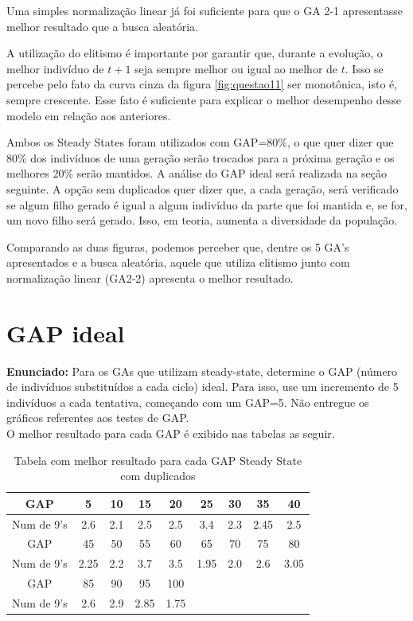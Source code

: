 \documentclass[12pt]{article}
\begin{document}
Uma simples normalização linear já foi suficiente para que o GA 2-1 apresentasse melhor resultado que a busca aleatória.

A utilização do elitismo é importante por garantir que, durante a evolução, o melhor indivíduo de $t+1$ seja sempre melhor ou igual ao melhor de $t$. Isso se percebe pelo fato da curva cinza da figura \ref{fig:questao11} ser monotônica, isto é, sempre crescente. Esse fato é suficiente para explicar o melhor desempenho desse modelo em relação aos anteriores.

Ambos os Steady States foram utilizados com GAP=80\%, o que quer dizer que 80\% dos indivíduos de uma geração serão trocados para a próxima geração e os melhores 20\% serão mantidos. A análise do GAP ideal será realizada na seção seguinte. A opção sem duplicados quer dizer que, a cada geração, será verificado se algum filho gerado é igual a algum indivíduo da parte que foi mantida e, se for, um novo filho será gerado. Isso, em teoria, aumenta a diversidade da população.

Comparando as duas figuras, podemos perceber que, dentre os 5 GA's apresentados e a busca aleatória, aquele que utiliza elitismo junto com normalização linear (GA2-2) apresenta o melhor resultado.

\section{GAP ideal}
\textbf{Enunciado:} Para os GAs que utilizam steady-state, determine o GAP (número de indivíduos substituídos a cada ciclo) ideal. Para isso, use um incremento de 5 indivíduos a cada tentativa, começando com um GAP=5. Não entregue os gráficos referentes aos testes de GAP.\\

O melhor resultado para cada GAP é exibido nas tabelas as seguir.

\begin{table}[H]
	\centering
	\begin{tabular}{|c|c|c|c|c|c|c|c|c|}
		\hline
		GAP & 5 & 10 & 15 & 20 & 25 & 30 & 35 & 40 \\
		\hline
		Num de 9's &2.6  &2.1  &2.5  &2.5  &3.4  &2.3  &2.45  &2.5  \\
		\hline
		GAP & 45 & 50 & 55 & 60 & 65 & 70 & 75 & 80 \\
		\hline
		Num de 9's &2.25  &2.2  &3.7  &3.5  &1.95  &2.0  &2.6  &3.05  \\
		\hline
		GAP & 85 & 90 & 95 & 100 &  &  &  &  \\
		\hline
		Num de 9's &2.6  &2.9  &2.85  &1.75  &  &  &  &  \\
		\hline
	\end{tabular}
	\caption{Tabela com melhor resultado para cada GAP Steady State com duplicados}
\end{table}
\end{document}
